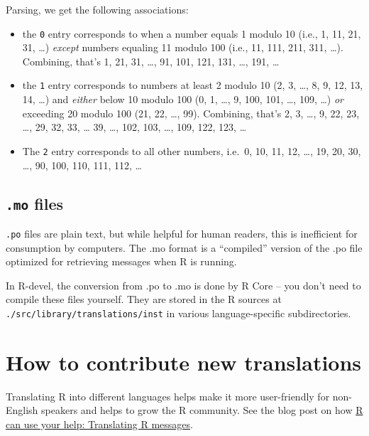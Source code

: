 \documentclass[
]{book}
\providecommand{\tightlist}{%
  \setlength{\itemsep}{0pt}\setlength{\parskip}{0pt}}
\begin{document}
Parsing, we get the following associations:

\begin{itemize}
\tightlist
\item
  the \texttt{0} entry corresponds to when a number equals 1 modulo 10 (i.e.,
  1, 11, 21, 31, \ldots) \emph{except} numbers equaling 11 modulo 100 (i.e.,
  11, 111, 211, 311, \ldots). Combining, that's 1, 21, 31, \ldots, 91, 101,
  121, 131, \ldots, 191, \ldots{}
\item
  the \texttt{1} entry corresponds to numbers at least 2 modulo 10 (2, 3,
  \ldots, 8, 9, 12, 13, 14, \ldots) and \emph{either} below 10 modulo 100 (0, 1,
  \ldots, 9, 100, 101, \ldots, 109, \ldots) \emph{or} exceeding 20 modulo 100 (21,
  22, \ldots, 99). Combining, that's 2, 3, \ldots, 9, 22, 23, \ldots, 29, 32,
  33, \ldots{} 39, \ldots, 102, 103, \ldots, 109, 122, 123, \ldots{}
\item
  The \texttt{2} entry corresponds to all other numbers, i.e.~0, 10, 11, 12,
  \ldots, 19, 20, 30, \ldots, 90, 100, 110, 111, 112, \ldots{}
\end{itemize}

\subsection{\texorpdfstring{\texttt{.mo} files}{.mo files}}\label{mo-files}

\texttt{.po} files are plain text, but while helpful for human readers, this is
inefficient for consumption by computers. The .mo format is a ``compiled''
version of the .po file optimized for retrieving messages when R is
running.

In R-devel, the conversion from .po to .mo is done by R Core -- you
don't need to compile these files yourself. They are stored in the R
sources at \texttt{./src/library/translations/inst} in various
language-specific subdirectories.

\section{How to contribute new translations}\label{how-to-contribute-new-translations}

Translating R into different languages helps make it more user-friendly
for non-English speakers and helps to grow the R community. See the blog
post on how \href{https://blog.r-project.org/2022/07/25/r-can-use-your-help-translating-r-messages}{R can use your help: Translating R
messages}.
\end{document}

